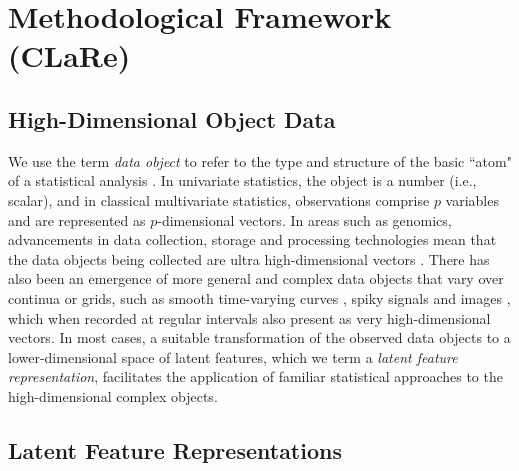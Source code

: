 \section{Methodological Framework (CLaRe)}\label{sec:materials-and-methods}

\subsection{High-Dimensional Object Data}

We use the term \emph{data object} to refer to the type and structure of the basic ``atom" of a statistical analysis
\parencite[][p.1]{marron_object_2021}.
In univariate statistics, the object is a number (i.e., scalar), and in classical multivariate statistics, observations comprise $p$ variables and are represented as $p$-dimensional vectors.
In areas such as genomics, advancements in data collection, storage and processing technologies mean that the data objects being collected are ultra high-dimensional vectors \parencite{stein_case_2010}.
There has also been an emergence of more general and complex data objects that vary over continua or grids, such as smooth time-varying curves \parencite{ramsay_functional_2005}, spiky signals \parencite{morris_wavelet-based_2006} and images \parencite{morris_automated_2011}, which when recorded at regular intervals also present as very high-dimensional vectors.
In most cases, a suitable transformation of the observed data objects to a lower-dimensional space of latent features, which we term a \emph{latent feature representation}, facilitates the application of familiar statistical approaches to the high-dimensional complex objects.








\subsection{Latent Feature Representations}

